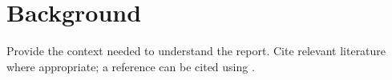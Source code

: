 \section{Background}
Provide the context needed to understand the report. Cite relevant literature
where appropriate; a reference can be cited using \cite{lamport1994latex}.
